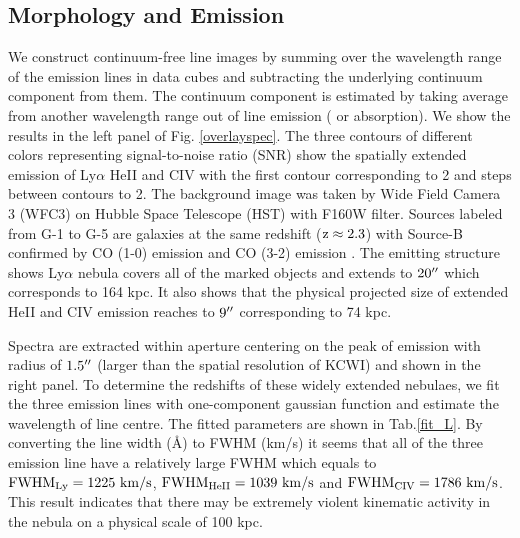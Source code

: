 \subsection{Morphology and Emission}

We construct continuum-free line images by summing over the wavelength range of the emission lines in data cubes and subtracting the underlying continuum component from them. The continuum component is estimated by taking average from another wavelength range out of line emission ( or absorption). We show the results in the left panel of Fig. \ref{overlayspec}. The three contours of different colors representing signal-to-noise ratio (SNR) show the spatially extended emission of Ly$\alpha$ HeII and CIV with the first contour corresponding to 2 and steps between contours to 2. The background image was taken by Wide Field Camera 3 (WFC3) on Hubble Space Telescope (HST) with F160W filter. Sources labeled from G-1 to G-5 are galaxies at the same redshift ($\rm z \approx 2.3$) with Source-B confirmed by CO (1-0) emission and CO (3-2) emission \citep{emonts2019cold,qiongli2020}. The emitting structure shows Ly$\alpha$ nebula covers all of the marked objects and extends to $\rm 20\mbox{$^{\prime\prime}$}$ which corresponds to 164 kpc. It also shows that the physical projected size of extended HeII and CIV emission reaches to $9 \mbox{$^{\prime\prime}$}$ corresponding to 74 kpc.

Spectra are extracted within aperture centering on the peak of emission with radius of $1.5\mbox{$^{\prime\prime}$}$ (larger than the spatial resolution of KCWI) and shown in the right panel. To determine the redshifts of these widely extended nebulaes, we fit the three emission lines with one-component gaussian function and estimate the wavelength of line centre. The fitted parameters are shown in Tab.\ref{fit_L}. By converting the line width (\AA) to FWHM (km/s) it seems that all of the three emission line have a relatively large FWHM which equals to $\rm FWHM_{Ly}=1225 \ km/s$, $\rm FWHM_{HeII}=1039 \ km/s$ and $\rm FWHM_{CIV}=1786 \ km/s$. This result indicates that there may be extremely violent kinematic activity in the nebula on a physical scale of 100 kpc.

